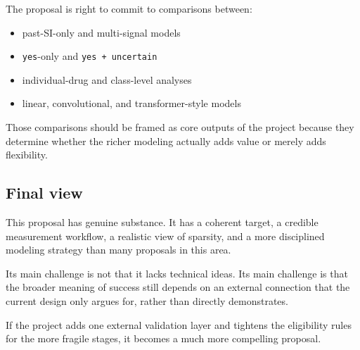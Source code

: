 The proposal is right to commit to comparisons between:

\begin{itemize}
\tightlist
\item
  past-SI-only and multi-signal models
\item
  \texttt{yes}-only and \texttt{yes\ +\ uncertain}
\item
  individual-drug and class-level analyses
\item
  linear, convolutional, and transformer-style models
\end{itemize}

Those comparisons should be framed as core outputs of the project
because they determine whether the richer modeling actually adds value
or merely adds flexibility.

\subsection{Final view}\label{final-view}

This proposal has genuine substance. It has a coherent target, a
credible measurement workflow, a realistic view of sparsity, and a more
disciplined modeling strategy than many proposals in this area.

Its main challenge is not that it lacks technical ideas. Its main
challenge is that the broader meaning of success still depends on an
external connection that the current design only argues for, rather than
directly demonstrates.

If the project adds one external validation layer and tightens the
eligibility rules for the more fragile stages, it becomes a much more
compelling proposal.
